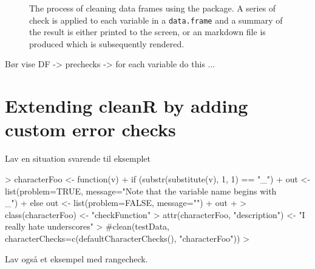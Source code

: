\documentclass[article]{jss}
\begin{document}
\begin{figure}
\begin{center}
\end{center}
\label{fig:flowchart1}
\caption{The process of cleaning data frames using the 
  package. A series of check is applied to each variable in a
  \texttt{data.frame} and a summary of the result is either printed to
  the screen, or an  markdown file is produced which is
  subsequently rendered.}
\end{figure}

Bør vise DF -> prechecks -> for each variable do this ...



\section{Extending cleanR by adding custom error checks} \label{sec:extending}

Lav en situation svarende til eksemplet

\begin{Schunk}
\begin{Sinput}
> characterFoo <- function(v) {
+     if (substr(substitute(v), 1, 1) == "_") {
+         out <- list(problem=TRUE, message="Note that the variable name begins with \\_")
+     } else out <- list(problem=FALSE, message="")
+     out
+ }
> class(characterFoo) <- "checkFunction"
> attr(characterFoo, "description") <- "I really hate underscores"
> #clean(testData, characterChecks=c(defaultCharacterChecks(), "characterFoo"))
> 
\end{Sinput}
\end{Schunk}


Lav også et eksempel med rangecheck.
\end{document}
